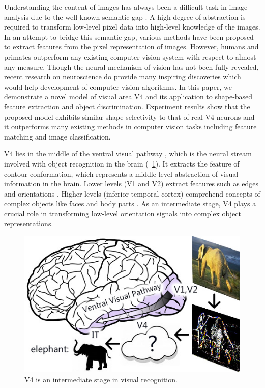 \documentclass[9pt,twocolumn]{article}
\begin{document}
Understanding the content of images has always been a difficult task in image analysis due to the well known semantic gap \cite{smeulders2000}.
A high degree of abstraction is required to transform low-level pixel data into high-level knowledge of the images.
In an attempt to bridge this semantic gap, various methods have been proposed to extract features from the pixel representation of images.
However, humans and primates outperform any existing computer vision system with respect to almost any measure.
Though the neural mechanism of vision has not been fully revealed,
recent research on neuroscience do provide many inspiring discoveries which would help development of computer vision algorithms.
In this paper, we demonstrate a novel model of visual area V4 and its application to shape-based feature extraction and object discrimination.
Experiment results show that the proposed model exhibits similar shape selectivity to that of real V4 neurons
and it outperforms many existing methods in computer vision tasks including feature matching and image classification. 

V4 lies in the middle of the ventral visual pathway \cite{ettlinger1990}, 
which is the neural stream involved with object recognition in the brain (\figurename~\ref{fig:1}).
It extracts the feature of contour conformation, which represents a middle level abstraction of visual information in the brain.
Lower levels (V1 and V2) extract features such as edges and orientations \cite{hubel1962}.
Higher levels (inferior temporal cortex) comprehend concepts of complex objects like faces and body parts \cite{bell2009}.
As an intermediate stage, V4 plays a crucial role in transforming low-level orientation signals into complex object representations.

\begin{figure}
\centerline{\includegraphics[width=0.8\linewidth]{images/fig1.jpg}} 
\caption{V4 is an intermediate stage in visual recognition.}
\label{fig:1}
\end{figure}
\end{document}
